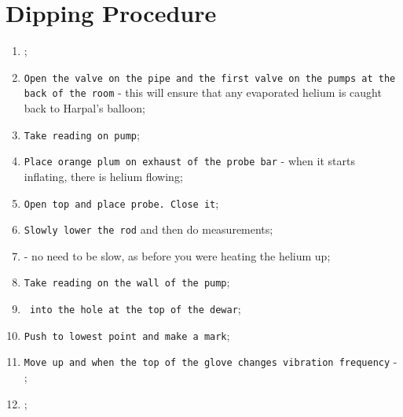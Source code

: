 
\newpage\section{Dipping Procedure}
\label{sec:dipping-procedure}

\begin{enumerate}
\item {};
\item \texttt{Open  the valve on the  pipe and the first  valve on the
    pumps  at the  back  of the  room}  - this  will  ensure that  any
  evaporated helium is caught back to Harpal's balloon;
\item \texttt{Take reading on pump};
\item \texttt{Place orange plum on exhaust of the probe bar} - when it
  starts inflating, there is helium flowing;
\item \texttt{Open top and place probe. Close it};
\item \texttt{Slowly lower the rod} and then do measurements;
\item {} - no need to be slow,
  as before you were heating the helium up;
\item \texttt{Take reading on the wall of the pump};
\item \texttt{ into the hole at the top
    of the dewar};
\item \texttt{Push to lowest point and make a mark};
\item \texttt{Move up and when the  top of the glove changes vibration
    frequency} - ;
\item {};
\end{enumerate}

\newpage

